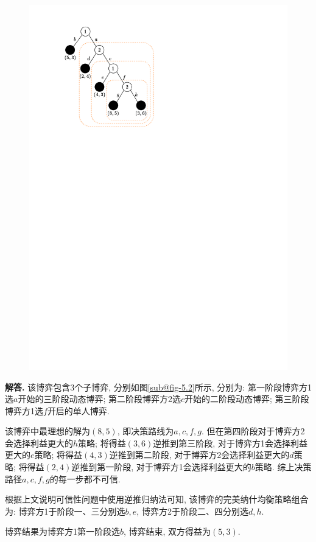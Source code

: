 \documentclass[12pt, a4paper, oneside]{ctexart}
\newenvironment{solution}{\par\noindent\textbf{解答. }}{\bigskip\par}
\def\del{\vspace{-3.5ex}}  %
\begin{document}
\begin{figure}[htbp]
{\begin{minipage}[b]{.45\linewidth}
            \includegraphics[scale=1]{经济博弈论3.5_2.pdf}
        \end{minipage}
    }
\end{figure}\del
\begin{solution}
    该博弈包含$3$个子博弈, 分别如图\ref{sub@fig-5.2}所示, 分别为: 第一阶段博弈方1选$a$开始的三阶段动态博弈; 第二阶段博弈方2选$c$开始的二阶段动态博弈; 第三阶段博弈方1选$f$开启的单人博弈.

    该博弈中最理想的解为$(8,5)$, 即决策路线为$a,c,f,g$. 但在第四阶段对于博弈方2会选择利益更大的$h$策略; 将得益$(3,6)$逆推到第三阶段, 对于博弈方1会选择利益更大的$e$策略; 将得益$(4,3)$逆推到第二阶段, 对于博弈方2会选择利益更大的$d$策略; 将得益$(2,4)$逆推到第一阶段, 对于博弈方1会选择利益更大的$b$策略. 综上决策路径$a,c,f,g$的每一步都不可信.

    根据上文说明可信性问题中使用逆推归纳法可知, 该博弈的完美纳什均衡策略组合为: 博弈方1于阶段一、三分别选$b, e$, 博弈方2于阶段二、四分别选$d, h$.
    
    博弈结果为博弈方1第一阶段选$b$, 博弈结束, 双方得益为$(5,3)$.
\end{solution}
\end{document}
